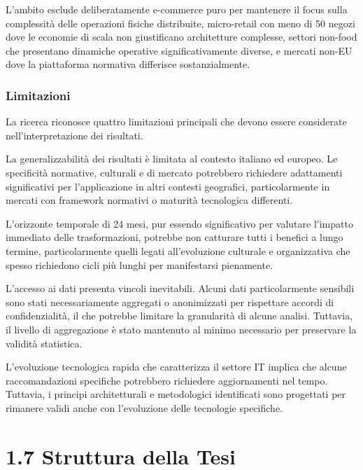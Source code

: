 \documentclass{report}
\begin{document}
L'ambito esclude deliberatamente e-commerce puro per mantenere il focus sulla complessità delle operazioni fisiche distribuite, micro-retail con meno di 50 negozi dove le economie di scala non giustificano architetture complesse, settori non-food che presentano dinamiche operative significativamente diverse, e mercati non-EU dove la piattaforma normativa differisce sostanzialmente.

\subsubsection{\texorpdfstring{\textbf{
Limitazioni}}{1.6.2 Limitazioni}}\label{limitazioni}

La ricerca riconosce quattro limitazioni principali che devono essere
considerate nell'interpretazione dei risultati.

La generalizzabilità dei risultati è limitata al contesto italiano ed
europeo. Le specificità normative, culturali e di mercato potrebbero
richiedere adattamenti significativi per l'applicazione in altri
contesti geografici, particolarmente in mercati con framework normativi
o maturità tecnologica differenti.

L'orizzonte temporale di 24 mesi, pur essendo significativo per valutare
l'impatto immediato delle trasformazioni, potrebbe non catturare tutti i
benefici a lungo termine, particolarmente quelli legati all'evoluzione
culturale e organizzativa che spesso richiedono cicli più lunghi per
manifestarsi pienamente.

L'accesso ai dati presenta vincoli inevitabili. Alcuni dati
particolarmente sensibili sono stati necessariamente aggregati o
anonimizzati per rispettare accordi di confidenzialità, il che potrebbe
limitare la granularità di alcune analisi. Tuttavia, il livello di
aggregazione è stato mantenuto al minimo necessario per preservare la
validità statistica.

L'evoluzione tecnologica rapida che caratterizza il settore IT implica
che alcune raccomandazioni specifiche potrebbero richiedere
aggiornamenti nel tempo. Tuttavia, i principi architetturali e
metodologici identificati sono progettati per rimanere validi anche con
l'evoluzione delle tecnologie specifiche.

\section{\texorpdfstring{\textbf{1.7 Struttura della
Tesi}}{1.7 Struttura della Tesi}}\label{struttura-della-tesi}
\end{document}
